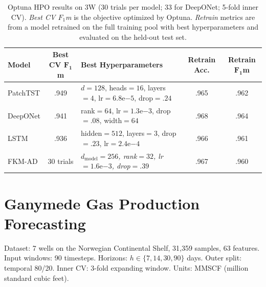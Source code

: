 \documentclass[11pt]{article}
\begin{document}
\begin{table}[ht]
\centering
\caption{Optuna HPO results on 3W (30 trials per model; 33 for DeepONet; 5-fold inner CV).
\emph{Best CV $F_1$m} is the objective optimized by Optuna.
\emph{Retrain} metrics are from a model retrained on the full training pool with best hyperparameters and evaluated on the held-out test set.}
\label{tab:3w_hpo}
\small
\setlength{\tabcolsep}{3pt}
\begin{tabular}{@{}l c l cc@{}}
\toprule
\textbf{Model} & \textbf{Best CV} $\boldsymbol{F_1}$\textbf{m} & \textbf{Best Hyperparameters} & \textbf{Retrain Acc.} & \textbf{Retrain} $\boldsymbol{F_1}$\textbf{m} \\
\midrule
PatchTST & .949 & $d{=}128$, heads${=}16$, layers${=}4$, lr${=}6.8\mathrm{e}{-5}$, drop${=}.24$ & .965 & .962 \\
DeepONet & .941 & rank${=}64$, lr${=}1.3\mathrm{e}{-3}$, drop${=}.08$, width${=}64$ & .968 & .964 \\
LSTM     & .936 & hidden${=}512$, layers${=}3$, drop${=}.23$, lr${=}2.4\mathrm{e}{-4}$ & .966 & .961 \\
FKM-AD   & 30 trials & \multicolumn{1}{l}{\emph{$d_\text{model}{=}256$, rank${=}32$, lr${=}1.6\mathrm{e}{-3}$, drop${=}.39$}} & .967 & .960 \\
\bottomrule
\end{tabular}
\end{table}


\newpage
\section{Ganymede Gas Production Forecasting}

Dataset: 7 wells on the Norwegian Continental Shelf, 31,359 samples, 63 features.
Input windows: 90 timesteps. Horizons: $h \in \{7, 14, 30, 90\}$ days.
Outer split: temporal 80/20. Inner CV: 3-fold expanding window.
Units: MMSCF (million standard cubic feet).
\end{document}
